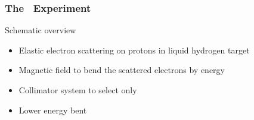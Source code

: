 \begin{frame}[t]
 \frametitle{The \Qweak\ Experiment}
 \begin{block}{Schematic overview}
  \begin{itemize}
   \item Elastic electron scattering on protons in liquid hydrogen target
   \item Magnetic field to bend the scattered electrons by energy
   \item Collimator system to select  only
   \item Lower energy  bent 
  \end{itemize}
 \end{block}
 \begin{center}
 \end{center}
\end{frame}
